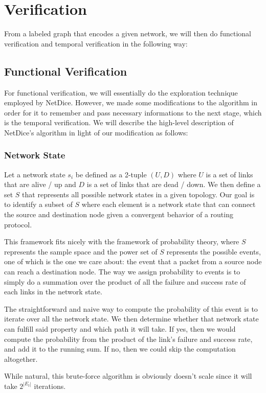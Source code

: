 \documentclass[10pt,sigconf,letterpaper,anonymous,nonacm]{acmart}
\begin{document}
\section{Verification} \label{verification}
From a labeled graph that encodes a given network, we will then do functional verification 
and temporal verification in the following way:

\subsection{Functional Verification}
For functional verification, we will essentially do the exploration technique employed by NetDice.
However, we made some modifications to the algorithm in order for it to remember and pass 
necessary informations to the next stage, which is the temporal verification.
We will describe the high-level description of NetDice's algorithm in light of our modification
as follows:

\subsubsection{Network State}
Let a network state $s_i$ be defined as a 2-tuple $(U, D)$ where $U$ is a set of links that are 
alive / up and $D$ is a set of links that are dead / down.
We then define a set $S$ that represents all possible network states in a given topology. 
Our goal is to identify a subset of $S$ where each element is a network state that can connect 
the source and destination node given a convergent behavior of a routing protocol.

This framework fits nicely with the framework of probability theory, where $S$ represents the 
sample space and the power set of $S$ represents the possible events, one of which is the one
we care about: the event that a packet from a source node can reach a destination node.
The way we assign probability to events is to simply do a summation over the product of all the 
failure and success rate of each links in the network state.

The straightforward and naive way to compute the probability of this event is to iterate over all 
the network state. 
We then determine whether that network state can fulfill said property and which path it will 
take. 
If yes, then we would compute the probability from the product of the link's failure and success 
rate, and add it to the running sum.
If no, then we could skip the computation altogether.

While natural, this brute-force algorithm is obviously doesn't scale since it will take 
$2^{|E_t|}$ iterations. 
\end{document}
